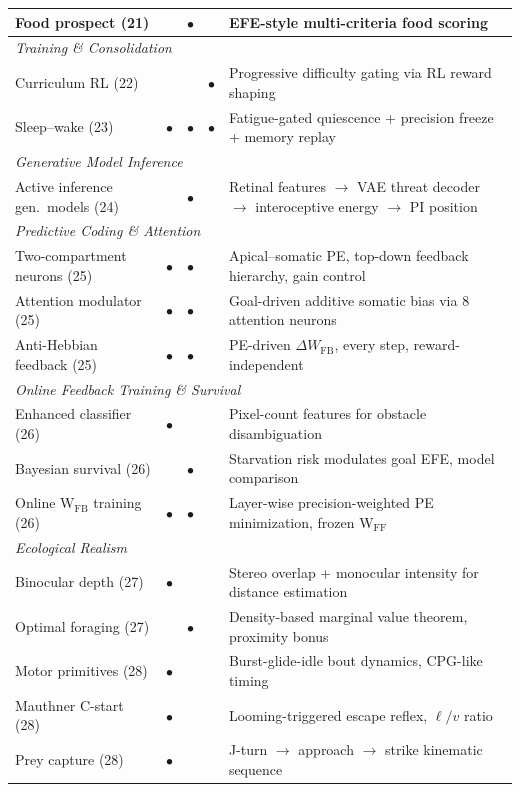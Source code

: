 \documentclass[11pt,a4paper]{article}
\begin{document}
\begin{table}[H]
\begin{tabular}{lcccp{5.8cm}}
Food prospect (21)             &           & $\bullet$ &           & EFE-style multi-criteria food scoring \\
\midrule
\multicolumn{5}{l}{\textit{Training \& Consolidation}} \\
Curriculum RL (22)             &           &           & $\bullet$ & Progressive difficulty gating via RL reward shaping \\
Sleep--wake (23)               & $\bullet$ & $\bullet$ & $\bullet$ & Fatigue-gated quiescence + precision freeze + memory replay \\
\midrule
\multicolumn{5}{l}{\textit{Generative Model Inference}} \\
Active inference gen.\ models (24) &           & $\bullet$ &           & Retinal features $\to$ VAE threat decoder $\to$ interoceptive energy $\to$ PI position \\
\midrule
\multicolumn{5}{l}{\textit{Predictive Coding \& Attention}} \\
Two-compartment neurons (25)       & $\bullet$ & $\bullet$ &           & Apical--somatic PE, top-down feedback hierarchy, gain control \\
Attention modulator (25)           & $\bullet$ & $\bullet$ &           & Goal-driven additive somatic bias via 8 attention neurons \\
Anti-Hebbian feedback (25)         & $\bullet$ & $\bullet$ &           & PE-driven $\Delta W_\text{FB}$, every step, reward-independent \\
\midrule
\multicolumn{5}{l}{\textit{Online Feedback Training \& Survival}} \\
Enhanced classifier (26)           & $\bullet$ &           &           & Pixel-count features for obstacle disambiguation \\
Bayesian survival (26)             &           & $\bullet$ &           & Starvation risk modulates goal EFE, model comparison \\
Online W$_\text{FB}$ training (26) & $\bullet$ & $\bullet$ &           & Layer-wise precision-weighted PE minimization, frozen W$_\text{FF}$ \\
\midrule
\multicolumn{5}{l}{\textit{Ecological Realism}} \\
Binocular depth (27)              & $\bullet$ &           &           & Stereo overlap + monocular intensity for distance estimation \\
Optimal foraging (27)             &           & $\bullet$ &           & Density-based marginal value theorem, proximity bonus \\
Motor primitives (28)             & $\bullet$ &           &           & Burst-glide-idle bout dynamics, CPG-like timing \\
Mauthner C-start (28)             & $\bullet$ &           &           & Looming-triggered escape reflex, $\ell/v$ ratio \\
Prey capture (28)                 & $\bullet$ &           &           & J-turn $\to$ approach $\to$ strike kinematic sequence \\
\bottomrule
\end{tabular}
\end{table}
\end{document}
